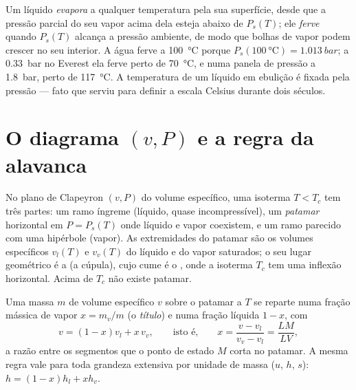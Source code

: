 \begin{remark}\label{rem:b1:phase-changes:boiling}
Um líquido \emph{evapora} a qualquer temperatura pela sua superfície,
desde que a pressão parcial do seu vapor acima dela esteja abaixo de
$P_s(T)$; ele \emph{ferve} quando $P_s(T)$ alcança a pressão ambiente, de
modo que bolhas de vapor podem crescer no seu interior. A água ferve a
\qty{100}{\degreeCelsius} porque $P_s(\qty{100}{\degreeCelsius}) = \qty{1.013}{bar}$;
a \qty{0.33}{bar} no Everest ela ferve perto de \qty{70}{\degreeCelsius}, e
numa panela de pressão a \qty{1.8}{bar}, perto de \qty{117}{\degreeCelsius}. A
temperatura de um líquido em ebulição é fixada pela pressão --- fato que
serviu para definir a escala Celsius durante dois séculos.
\end{remark}

\section{O diagrama $(v, P)$ e a regra da alavanca}

\begin{proposition}\label{prop:b1:phase-changes:andrews}
No plano de Clapeyron $(v, P)$ do volume específico, uma isoterma
$T < T_c$ tem três partes: um ramo íngreme (líquido, quase
incompressível), um \emph{patamar} horizontal em $P = P_s(T)$ onde líquido
e vapor coexistem, e um ramo parecido com uma hipérbole (vapor). As
extremidades do patamar são os volumes específicos $v_l(T)$ e $v_v(T)$ do
líquido e do vapor saturados; o seu lugar geométrico é a \emph{} (a cúpula), cujo cume é o , onde a isoterma $T_c$
tem uma inflexão horizontal. Acima de $T_c$ não existe patamar.
\end{proposition}
\admitted

\begin{theorem}\label{thm:b1:phase-changes:lever}
Uma massa $m$ de volume específico $v$ sobre o patamar a $T$ se reparte numa
fração mássica de vapor $x = m_v/m$ (o \emph{título}) e numa fração
líquida $1 - x$, com
\[
v = (1 - x)v_l + x\,v_v , \qquad\text{isto é,}\qquad
x = \frac{v - v_l}{v_v - v_l} = \frac{LM}{LV} ,
\]
a razão entre os segmentos que o ponto de estado $M$ corta no patamar.
A mesma regra vale para toda grandeza extensiva por unidade de massa ($u$,
$h$, $s$): $h = (1 - x)h_l + xh_v$.
\end{theorem}

